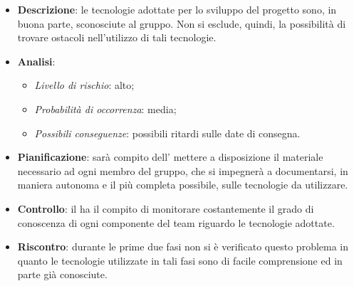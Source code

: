 			\begin{itemize}
				\item \textbf{Descrizione}: le tecnologie adottate per lo sviluppo del progetto sono, in buona parte, sconosciute al gruppo. Non si esclude, quindi, la possibilità di trovare ostacoli nell'utilizzo di tali tecnologie.
				\item \textbf{Analisi}:
					\begin{itemize}
						\item \textit{Livello di rischio}: alto;
						\item \textit{Probabilità di occorrenza}: media;
						\item \textit{Possibili conseguenze}: possibili ritardi sulle date di consegna.
					\end{itemize}
				\item \textbf{Pianificazione}: sarà compito dell' mettere a disposizione il materiale necessario ad ogni membro del gruppo, che si impegnerà a documentarsi, in maniera autonoma e il più completa possibile, sulle tecnologie da utilizzare.
				\item \textbf{Controllo}: il  ha il compito di monitorare costantemente il grado di conoscenza di ogni componente del team riguardo le tecnologie adottate.
				\item \textbf{Riscontro}: durante le prime due fasi non si è verificato questo problema in quanto le tecnologie utilizzate in tali fasi sono di facile comprensione ed in parte già conosciute.
			\end{itemize}
